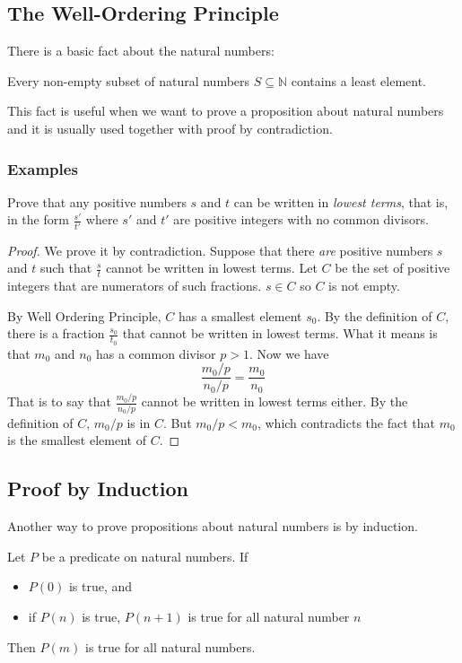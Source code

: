 \documentclass[11pt]{article}
\begin{document}
\subsection{The Well-Ordering Principle}

There is a basic fact about the natural numbers:

\begin{theorem}
Every non-empty subset of natural numbers $S \subseteq \mathbb{N}$ contains a least element.
\end{theorem}

This fact is useful when we want to prove a proposition about natural numbers and it is
usually used together with proof by contradiction.

\subsubsection{Examples}

Prove that any positive numbers $s$ and $t$ can be written in \emph{lowest terms}, that is,
in the form $\frac{s'}{t'}$ where $s'$ and $t'$ are positive integers with no common
divisors.

\begin{proof}
We prove it by contradiction. Suppose that there \emph{are} positive numbers $s$ and $t$
such that $\frac{s}{t}$ cannot be written in lowest terms. Let $C$ be the set of positive
integers that are numerators of such fractions. $s \in C$ so $C$ is not empty.

By Well Ordering Principle, $C$ has a smallest element $s_0$. By the definition of $C$,
there is a fraction $\frac{s_0}{t_0}$ that cannot be written in lowest terms. What it means
is that $m_0$ and $n_0$ has a common divisor $p > 1$. Now we have
\[
  \frac{m_0/p}{n_0/p} = \frac{m_0}{n_0}
\]
That is to say that $\frac{m_0/p}{n_0/p}$ cannot be written in lowest terms either. By the
definition of $C$, $m_0/p$ is in $C$. But $m_0/p < m_0$, which contradicts the fact that
$m_0$ is the smallest element of $C$.

\end{proof}

\subsection{Proof by Induction}

Another way to prove propositions about natural numbers is by induction.

\begin{theorem}
Let $P$ be a predicate on natural numbers. If
\begin{itemize}
\item $P(0)$ is true, and
\item if $P(n)$ is true, $P(n+1)$ is true for all natural number $n$
\end{itemize}
Then $P(m)$ is true for all natural numbers.
\end{theorem}
\end{document}
